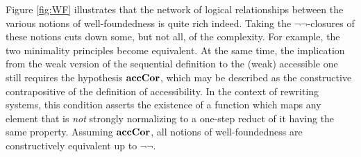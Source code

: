 Figure \ref{fig:WF} illustrates that the network of logical relationships between
the various notions of well-foundedness is quite rich indeed.
Taking the $\lnot\lnot$-closures of
these notions cuts down some, but not all, of the complexity.
For example, the two minimality principles become equivalent.
At the same time, the implication from the weak version of the sequential definition 
to the (weak) accessible one still requires the hypothesis $\mathbf{accCor}$,
which may be described as the constructive contrapositive of the definition of accessibility.
In the context of rewriting systems,
this condition asserts the existence of a function which maps any
element that is \emph{not} strongly normalizing to a one-step reduct of it having the same property.
Assuming $\mathbf{accCor}$, all notions of well-foundedness
are constructively equivalent up to $\lnot\lnot$.


